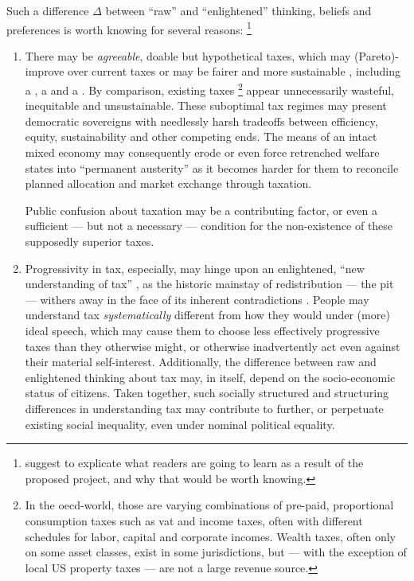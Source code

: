 Such a difference $\Delta$ between ``raw'' and ``enlightened'' thinking, %
beliefs \citep{Caplan2007} and preferences \citep{Fishkin2009} is worth knowing for several reasons:
\footnote{
	\cite{PrzeworskiSalomon1995} suggest to explicate what readers are going to learn as a result of the proposed project, and why that would be worth knowing.
}
\begin{enumerate}
	\item There may be \emph{agreeable}, doable but hypothetical taxes, which may (Pareto)-improve over current taxes \citep{Harberger1974} or may be fairer \citep{Rawls-1971} and more sustainable \citep{Solow1956}, including a  \citep{Mill1848,McCaffery2002,Frank2005a,Seidman1997}, a  \citep{George1879,Buiter1988} and a  \citep{Friedman1962}.
	By comparison, existing taxes
	\footnote{
		In the \gls{oecd}-world, those are varying combinations of pre-paid, proportional consumption taxes such as \gls{vat} and income taxes, often with different schedules for labor, capital and corporate incomes.
		Wealth taxes, often only on some asset classes, exist in some jurisdictions, but --- with the exception of local US property taxes --- are not a large revenue source.
	}
	appear unnecessarily wasteful, inequitable and unsustainable.
	These suboptimal tax regimes may present democratic sovereigns with needlessly harsh tradeoffs between efficiency, equity, sustainability and other competing ends.
	The means of an intact mixed economy \citep{MusgThet1959,Stiglitz2011} may consequently erode or even force retrenched welfare states into ``permanent austerity'' \citep{Pierson2002,StreeckMertens2010} as it becomes harder for them to reconcile planned allocation and market exchange through taxation.

	Public confusion about taxation may be a contributing factor, or even a sufficient --- but not a necessary --- condition for the non-existence of these supposedly superior taxes.

	\item Progressivity in tax, especially, may hinge upon an enlightened, ``new understanding of tax'' \citep{McCaffery2005}, as the historic mainstay of redistribution --- the \gls{pit} --- withers away in the face of its inherent contradictions \citep{McCafferyHines2010}.
	People may understand tax \emph{systematically} different from how they would under (more) ideal speech, which may cause them to choose less effectively progressive taxes than they otherwise might, or otherwise inadvertently act even against their material self-interest.
	Additionally, the difference between raw and enlightened thinking about tax may, in itself, depend on the socio-economic status of citizens.
	Taken together, such socially structured and structuring differences in understanding tax may contribute to further, or perpetuate existing social inequality, even under nominal political equality.


\end{enumerate}
